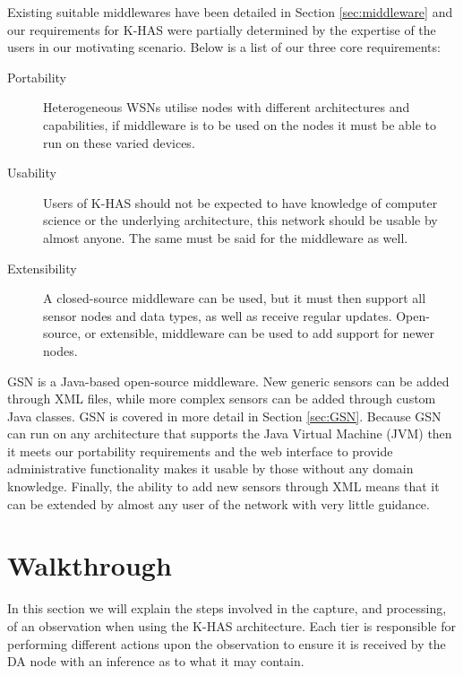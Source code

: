 	Existing suitable middlewares have been detailed in Section \ref{sec:middleware} and our requirements for K-HAS were partially determined by the expertise of the users in our motivating scenario. Below is a list of our three core requirements:
	\begin{description}
		\item[Portability] Heterogeneous WSNs utilise nodes with different architectures and capabilities, if middleware is to be used on the nodes it must be able to run on these varied devices. 
		\item[Usability] Users of K-HAS should not be expected to have knowledge of computer science or the underlying architecture, this network should be usable by almost anyone. The same must be said for the middleware as well.
		\item[Extensibility] A closed-source middleware can be used, but it must then support all sensor nodes and data types, as well as receive regular updates. Open-source, or extensible, middleware can be used to add support for newer nodes.
	\end{description}
	
	GSN is a Java-based open-source middleware. New generic sensors can be added through XML files, while more complex sensors can be added through custom Java classes. GSN is covered in more detail in Section \ref{sec:GSN}. Because GSN can run on any architecture that supports the Java Virtual Machine (JVM) then it meets our portability requirements and the web interface to provide administrative functionality makes it usable by those without any domain knowledge. Finally, the ability to add new sensors through XML means that it can be extended by almost any user of the network with very little guidance.
	
	\section{Walkthrough}
		In this section we will explain the steps involved in the capture, and processing, of an observation when using the K-HAS architecture. Each tier is responsible for performing different actions upon the observation to ensure it is received by the DA node with an inference as to what it may contain.
		
